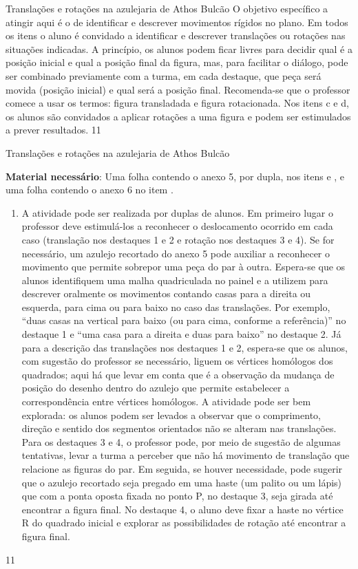 \marginpar{\vspace{-1.25em}}
\begin{objectives}{Translações e rotações na azulejaria de Athos Bulcão}
{
O objetivo específico a atingir aqui é o de identificar e descrever movimentos rígidos no plano. Em todos os itens o aluno é convidado a identificar e descrever translações ou rotações nas situações indicadas. A princípio, os alunos podem ficar livres para decidir qual é a posição inicial e qual a posição final da figura, mas, para facilitar o diálogo, pode ser combinado previamente com a turma, em cada destaque, que peça será movida (posição inicial) e qual será a posição final. Recomenda-se que o professor comece a usar os termos: figura transladada e figura rotacionada. Nos itens c e d, os alunos são convidados a aplicar rotações a uma figura e podem ser estimulados a prever resultados. 
}{1}{1}
\end{objectives}
\begin{sugestions}{Translações e rotações na azulejaria de Athos Bulcão}
{
\textbf{Material necessário}: Uma folha contendo o anexo 5, por dupla, nos itens  e , e uma folha contendo o anexo 6 no item .
\begin{enumerate}[label=\titem{\alph*)}]
\item A atividade pode ser realizada por duplas de alunos. Em primeiro lugar o professor deve estimulá-los a reconhecer o deslocamento ocorrido em cada caso (translação nos destaques 1 e 2 e rotação nos destaques 3 e 4). Se for necessário, um azulejo recortado do anexo 5 pode auxiliar a reconhecer o movimento que permite sobrepor uma peça do par à outra. Espera-se que os alunos identifiquem uma malha quadriculada no painel e a utilizem para descrever oralmente os movimentos contando casas para a direita ou esquerda, para cima ou para baixo no caso das translações. Por exemplo, “duas casas na vertical para baixo (ou para cima, conforme a referência)” no destaque 1 e “uma casa para a direita e duas para baixo” no destaque 2. Já para a descrição das translações nos destaques 1 e 2, espera-se que os alunos, com sugestão do professor se necessário, liguem os vértices homólogos dos quadrados; aqui há que levar em conta que é a observação da mudança de posição do desenho dentro do azulejo que permite estabelecer a correspondência entre vértices homólogos. A atividade pode ser bem explorada: os alunos podem ser levados a   observar que o comprimento, direção e sentido dos segmentos orientados não se alteram nas translações. Para os destaques 3 e 4, o professor pode, por meio de sugestão de algumas tentativas, levar a turma a perceber que não há movimento de translação que relacione as figuras do par. Em seguida, se houver necessidade, pode sugerir que o azulejo recortado seja pregado em uma haste (um palito ou um lápis) que com a ponta oposta fixada no ponto P, no destaque 3, seja girada até encontrar a figura final. No destaque 4, o aluno deve fixar a haste no vértice R do quadrado inicial e explorar as possibilidades de rotação até encontrar a figura final. 
\end{enumerate}
}{1}{1}
\end{sugestions}
